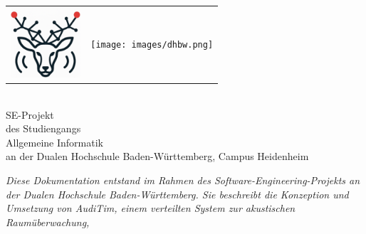 
\begin{titlepage}
	\begin{longtable}{p{} p{}}
	  {\includegraphics[height=2.6cm]{images/logo.png}} & 
	  {\texttt{[image: images/dhbw.png]}}
	\end{longtable}
	\enlargethispage{20mm}
	\begin{center}
	\vspace*{12mm}	{\LARGE\bf \titel }\\
    \vspace*{12mm} SE-Projekt\\
    \vspace*{3mm} des Studiengangs\\
    \vspace*{3mm} Allgemeine Informatik\\
    \vspace*{12mm} an der Dualen Hochschule Baden-Württemberg, Campus Heidenheim\\
	  \begin{center}
  \textit{Diese Dokumentation entstand im Rahmen des Software-Engineering-Projekts 
  an der Dualen Hochschule Baden-Württemberg. 
  Sie beschreibt die Konzeption und Umsetzung von AudiTim, einem verteilten System zur akustischen Raumüberwachung, 
}
\end{center}
\end{center}
\end{titlepage}
